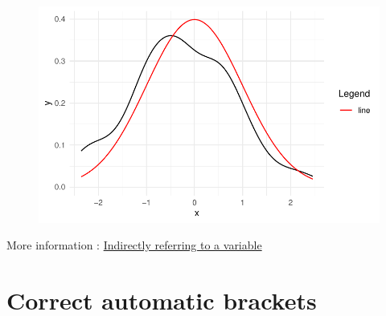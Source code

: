 \documentclass[
  letterpaper,
  DIV=11,
  numbers=noendperiod]{scrreprt}
\begin{document}
\begin{figure}[H]

{\centering \includegraphics{./ggplot2_files/figure-pdf/unnamed-chunk-2-1.pdf}

}

\end{figure}

More information :
\href{https://ggplot2-book.org/programming\#indirectly-referring-to-variables}{Indirectly
referring to a variable}

\hypertarget{correct-automatic-brackets}{%
\section{Correct automatic brackets}\label{correct-automatic-brackets}}
\end{document}
